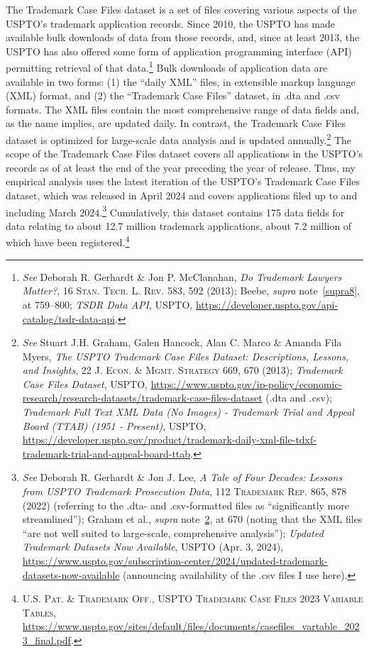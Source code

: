 \documentclass[letterpaper, 11pt, oneside]{article}
\begin{document}
The Trademark Case Files dataset is a set of files covering various aspects of the USPTO's trademark application records. Since 2010, the USPTO has made available bulk downloads of data from those records, and, since at least 2013, the USPTO has also offered some form of application programming interface (API) permitting retrieval of that data.\footnote{\label{supra21} \textit{See} Deborah R. Gerhardt \& Jon P. McClanahan, \textit{Do Trademark Lawyers Matter?}, 16 \textsc{Stan. Tech. L. Rev.} 583, 592 (2013); Beebe, \textit{supra} note~\ref{supra8}, at 759–800; \textit{TSDR Data API}, USPTO, \url{https://developer.uspto.gov/api-catalog/tsdr-data-api}.} Bulk downloads of application data are available in two forms: (1) the ``daily XML'' files, in extensible markup language (XML) format, and (2) the ``Trademark Case Files'' dataset, in .dta and .csv formats. The XML files contain the most comprehensive range of data fields and, as the name implies, are updated daily. In contrast, the Trademark Case Files dataset is optimized for large-scale data analysis and is updated annually.\footnote{\label{supra22} \textit{See} Stuart J.H. Graham, Galen Hancock, Alan C. Marco \& Amanda Fila Myers, \textit{The USPTO Trademark Case Files Dataset: Descriptions, Lessons, and Insights}, 22 \textsc{J. Econ. \& Mgmt. Strategy} 669, 670 (2013); \textit{Trademark Case Files Dataset}, USPTO, \url{https://www.uspto.gov/ip-policy/economic-research/research-datasets/trademark-case-files-dataset} (.dta and .csv); \textit{Trademark Full Text XML Data (No Images) - Trademark Trial and Appeal Board (TTAB) (1951 - Present)}, USPTO, \url{https://developer.uspto.gov/product/trademark-daily-xml-file-tdxf-trademark-trial-and-appeal-board-ttab}.} The scope of the Trademark Case Files dataset covers all applications in the USPTO's records as of at least the end of the year preceding the year of release. Thus, my empirical analysis uses the latest iteration of the USPTO's Trademark Case Files dataset, which was released in April 2024 and covers applications filed up to and including March 2024.\footnote{\textit{See} Deborah R. Gerhardt \& Jon J. Lee, \textit{A Tale of Four Decades: Lessons from USPTO Trademark Prosecution Data}, 112 \textsc{Trademark Rep.} 865, 878 (2022) (referring to the .dta- and .csv-formatted files as ``significantly more streamlined''); Graham et al., \textit{supra} note~\ref{supra22}, at 670 (noting that the XML files ``are not well suited to large-scale, comprehensive analysis''); \textit{Updated Trademark Datasets Now Available}, USPTO (Apr. 3, 2024), \url{https://www.uspto.gov/subscription-center/2024/updated-trademark-datasets-now-available} (announcing availability of the .csv files I use here).} Cumulatively, this dataset contains 175 data fields for data relating to about 12.7 million trademark applications, about 7.2 million of which have been registered.\footnote{\textsc{U.S. Pat. \& Trademark Off., USPTO Trademark Case Files 2023 Variable Tables}, \url{https://www.uspto.gov/sites/default/files/documents/casefiles_vartable_2023_final.pdf}.}
\end{document}
